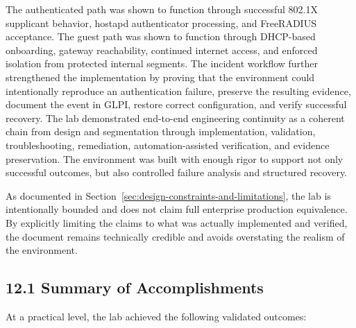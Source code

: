 \documentclass[11pt]{article}
\begin{document}
The authenticated path was shown to function through successful 802.1X supplicant behavior, hostapd authenticator processing, and FreeRADIUS acceptance. The guest path was shown to function through DHCP-based onboarding, gateway reachability, continued internet access, and enforced isolation from protected internal segments. The incident workflow further strengthened the implementation by proving that the environment could intentionally reproduce an authentication failure, preserve the resulting evidence, document the event in GLPI, restore correct configuration, and verify successful recovery. The lab demonstrated end-to-end engineering continuity as a coherent chain from design and segmentation through implementation, validation, troubleshooting, remediation, automation-assisted verification, and evidence preservation. The environment was built with enough rigor to support not only successful outcomes, but also controlled failure analysis and structured recovery.

As documented in Section~\ref{sec:design-constraints-and-limitations}, the lab is intentionally bounded and does not claim full enterprise production equivalence. By explicitly limiting the claims to what was actually implemented and verified, the document remains technically credible and avoids overstating the realism of the environment.


\subsection{12.1 Summary of Accomplishments}
\label{sec:summary-of-accomplishments}

At a practical level, the lab achieved the following validated outcomes:
\end{document}
